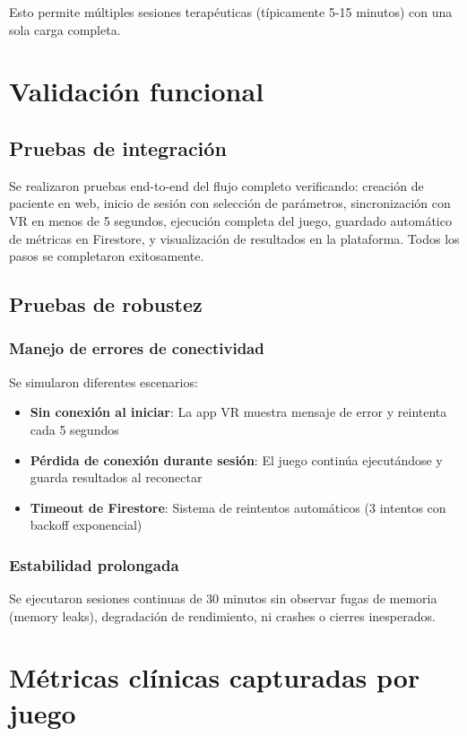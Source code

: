 Esto permite múltiples sesiones terapéuticas (típicamente 5-15 minutos) con una sola carga completa.

\section{Validación funcional}

\subsection{Pruebas de integración}

Se realizaron pruebas end-to-end del flujo completo verificando: creación de paciente en web, inicio de sesión con selección de parámetros, sincronización con VR en menos de 5 segundos, ejecución completa del juego, guardado automático de métricas en Firestore, y visualización de resultados en la plataforma. Todos los pasos se completaron exitosamente.

\subsection{Pruebas de robustez}

\subsubsection{Manejo de errores de conectividad}

Se simularon diferentes escenarios:
\begin{itemize}
    \item \textbf{Sin conexión al iniciar}: La app VR muestra mensaje de error y reintenta cada 5 segundos
    \item \textbf{Pérdida de conexión durante sesión}: El juego continúa ejecutándose y guarda resultados al reconectar
    \item \textbf{Timeout de Firestore}: Sistema de reintentos automáticos (3 intentos con backoff exponencial)
\end{itemize}

\subsubsection{Estabilidad prolongada}

Se ejecutaron sesiones continuas de 30 minutos sin observar fugas de memoria (memory leaks), degradación de rendimiento, ni crashes o cierres inesperados.

\section{Métricas clínicas capturadas por juego}

